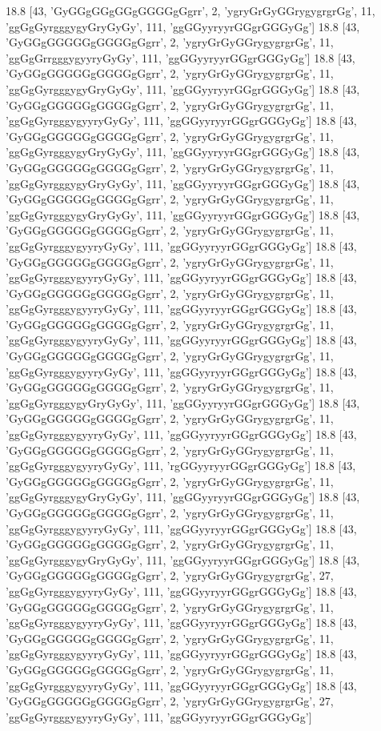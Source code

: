 18.8 [43, 'GyGGgGGgGGgGGGGgGgrr', 2, 'ygryGrGyGGrygygrgrGg', 11, 'ggGgGyrgggygyGryGyGy', 111, 'ggGGyyryyrGGgrGGGyGg']
18.8 [43, 'GyGGgGGGGGgGGGGgGgrr', 2, 'ygryGrGyGGrygygrgrGg', 11, 'ggGgGrrgggygyyryGyGy', 111, 'ggGGyyryyrGGgrGGGyGg']
18.8 [43, 'GyGGgGGGGGgGGGGgGgrr', 2, 'ygryGrGyGGrygygrgrGg', 11, 'ggGgGyrgggygyGryGyGy', 111, 'ggGGyyryyrGGgrGGGyGg']
18.8 [43, 'GyGGgGGGGGgGGGGgGgrr', 2, 'ygryGrGyGGrygygrgrGg', 11, 'ggGgGyrgggygyyryGyGy', 111, 'ggGGyyryyrGGgrGGGyGg']
18.8 [43, 'GyGGgGGGGGgGGGGgGgrr', 2, 'ygryGrGyGGrygygrgrGg', 11, 'ggGgGyrgggygyGryGyGy', 111, 'ggGGyyryyrGGgrGGGyGg']
18.8 [43, 'GyGGgGGGGGgGGGGgGgrr', 2, 'ygryGrGyGGrygygrgrGg', 11, 'ggGgGyrgggygyGryGyGy', 111, 'ggGGyyryyrGGgrGGGyGg']
18.8 [43, 'GyGGgGGGGGgGGGGgGgrr', 2, 'ygryGrGyGGrygygrgrGg', 11, 'ggGgGyrgggygyGryGyGy', 111, 'ggGGyyryyrGGgrGGGyGg']
18.8 [43, 'GyGGgGGGGGgGGGGgGgrr', 2, 'ygryGrGyGGrygygrgrGg', 11, 'ggGgGyrgggygyyryGyGy', 111, 'ggGGyyryyrGGgrGGGyGg']
18.8 [43, 'GyGGgGGGGGgGGGGgGgrr', 2, 'ygryGrGyGGrygygrgrGg', 11, 'ggGgGyrgggygyyryGyGy', 111, 'ggGGyyryyrGGgrGGGyGg']
18.8 [43, 'GyGGgGGGGGgGGGGgGgrr', 2, 'ygryGrGyGGrygygrgrGg', 11, 'ggGgGyrgggygyyryGyGy', 111, 'ggGGyyryyrGGgrGGGyGg']
18.8 [43, 'GyGGgGGGGGgGGGGgGgrr', 2, 'ygryGrGyGGrygygrgrGg', 11, 'ggGgGyrgggygyyryGyGy', 111, 'ggGGyyryyrGGgrGGGyGg']
18.8 [43, 'GyGGgGGGGGgGGGGgGgrr', 2, 'ygryGrGyGGrygygrgrGg', 11, 'ggGgGyrgggygyyryGyGy', 111, 'ggGGyyryyrGGgrGGGyGg']
18.8 [43, 'GyGGgGGGGGgGGGGgGgrr', 2, 'ygryGrGyGGrygygrgrGg', 11, 'ggGgGyrgggygyGryGyGy', 111, 'ggGGyyryyrGGgrGGGyGg']
18.8 [43, 'GyGGgGGGGGgGGGGgGgrr', 2, 'ygryGrGyGGrygygrgrGg', 11, 'ggGgGyrgggygyyryGyGy', 111, 'ggGGyyryyrGGgrGGGyGg']
18.8 [43, 'GyGGgGGGGGgGGGGgGgrr', 2, 'ygryGrGyGGrygygrgrGg', 11, 'ggGgGyrgggygyyryGyGy', 111, 'rgGGyyryyrGGgrGGGyGg']
18.8 [43, 'GyGGgGGGGGgGGGGgGgrr', 2, 'ygryGrGyGGrygygrgrGg', 11, 'ggGgGyrgggygyGryGyGy', 111, 'ggGGyyryyrGGgrGGGyGg']
18.8 [43, 'GyGGgGGGGGgGGGGgGgrr', 2, 'ygryGrGyGGrygygrgrGg', 11, 'ggGgGyrgggygyyryGyGy', 111, 'ggGGyyryyrGGgrGGGyGg']
18.8 [43, 'GyGGgGGGGGgGGGGgGgrr', 2, 'ygryGrGyGGrygygrgrGg', 11, 'ggGgGyrgggygyGryGyGy', 111, 'ggGGyyryyrGGgrGGGyGg']
18.8 [43, 'GyGGgGGGGGgGGGGgGgrr', 2, 'ygryGrGyGGrygygrgrGg', 27, 'ggGgGyrgggygyyryGyGy', 111, 'ggGGyyryyrGGgrGGGyGg']
18.8 [43, 'GyGGgGGGGGgGGGGgGgrr', 2, 'ygryGrGyGGrygygrgrGg', 11, 'ggGgGyrgggygyyryGyGy', 111, 'ggGGyyryyrGGgrGGGyGg']
18.8 [43, 'GyGGgGGGGGgGGGGgGgrr', 2, 'ygryGrGyGGrygygrgrGg', 11, 'ggGgGyrgggygyyryGyGy', 111, 'ggGGyyryyrGGgrGGGyGg']
18.8 [43, 'GyGGgGGGGGgGGGGgGgrr', 2, 'ygryGrGyGGrygygrgrGg', 11, 'ggGgGyrgggygyyryGyGy', 111, 'ggGGyyryyrGGgrGGGyGg']
18.8 [43, 'GyGGgGGGGGgGGGGgGgrr', 2, 'ygryGrGyGGrygygrgrGg', 27, 'ggGgGyrgggygyyryGyGy', 111, 'ggGGyyryyrGGgrGGGyGg']
